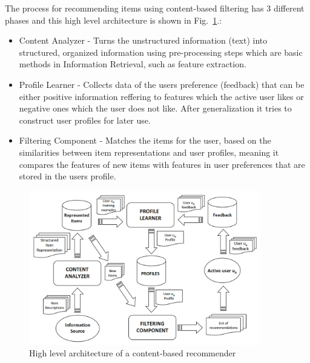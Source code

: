 \documentclass[\myFontSize,oneside,english,hidelinks,a4paper]{article}
\begin{document}
The process for recommending items using content-based filtering has 3 different phases and this high level architecture is shown in Fig.~\ref{fig:high_lvl_content_based}.:
\begin{itemize}
\item Content Analyzer - Turns the unstructured information (text) into structured, organized information using pre-processing steps which are basic methods in Information Retrieval, such as feature extraction.
\item Profile Learner - Collects data of the users preference (feedback) that can be either positive information reffering to features which the active user likes or negative ones which the user does not like. After generalization it tries to construct user profiles for later use.
\item Filtering Component - Matches the items for the user, based on the similarities between item representations and user profiles, meaning it compares the features of new items with features in user preferences that are stored in the users profile. \cite{pub.1034486657}
\end{itemize}
%

\begin{figure}[ht]
    \centering
    \includegraphics[width=0.9\textwidth]{img/content_based_figure_1.png}
    \caption{High level architecture of a content-based recommender \cite{Musto2022251}}
    \label{fig:high_lvl_content_based}
\end{figure}
\end{document}
